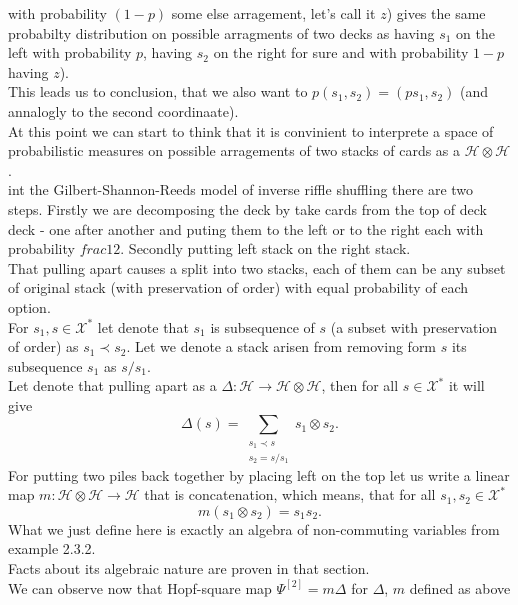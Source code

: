 \documentclass[a4paper]{article}
\begin{document}
with probability $(1 - p)$ some else arragement, let's call it $z$) gives the same probabilty distribution 
on possible arragments of two decks as having $s_1$ on the left with probability $p$, having $s_2$ on the 
right for sure and with probability $1-p$ having $z$).\\
This leads us to conclusion, that we also want to $p(s_1,s_2) = (ps_1, s_2)$ (and annalogly to the second 
coordinaate). \\
At this point we can start to think that it is convinient to interprete a space of probabilistic 
measures on possible arragements of two stacks of cards as a $\mathcal{H} \otimes \mathcal{H}$. \\[4pt]
int the Gilbert-Shannon-Reeds model of inverse riffle shuffling there are two steps. Firstly we are 
decomposing the deck by take cards from the top of deck deck - one after another and puting them to the left 
or to the right each with probability $frac{1}{2}$. Secondly putting left stack on the right stack. \\
That pulling apart causes a split into two stacks, each of them can be any subset of original stack 
(with preservation of order) with equal probability of each option. \\
For $s_1, s \in \mathcal{X}^*$ let denote that $s_1$ is subsequence of $s$ (a subset with preservation of 
order) as $s_1 \prec s_2$. Let we denote a stack arisen from removing form $s$ its subsequence $s_1$ as 
$s/s_1$. \\
Let denote that pulling apart as a $\Delta : \mathcal{H} \to \mathcal{H} \otimes \mathcal{H}$, then for all 
$s \in \mathcal{X}^*$ it will give
\begin{equation*}
\Delta(s) = \sum_{\substack{s_1 \prec s \\ s_2 = s/s_1}}
s_1 \otimes s_2.
\end{equation*}
For putting two piles back together by placing left on the top let us write a linear map 
$m : \mathcal{H} \otimes \mathcal{H} \to \mathcal{H}$ that is concatenation, which means, that 
for all $s_1, s_2 \in \mathcal{X}^*$
\begin{equation*}
m(s_1 \otimes s_2) = s_1s_2.
\end{equation*}
What we just define here is exactly an algebra of non-commuting variables from example 
2.3.2.\\
Facts about its algebraic nature are proven in that section. \\
We can observe now that Hopf-square map $\Psi^{[2]} = m\Delta$ for $\Delta$, $m$ defined as above 
\end{document}
